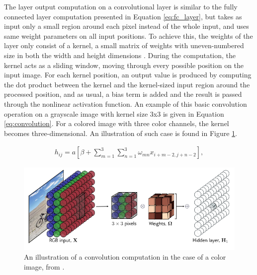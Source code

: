 \documentclass{article}
\begin{document}
The layer output computation on a convolutional layer is similar to the fully connected layer computation
presented in Equation \ref{eq:fc_layer}, but takes as input only a small region around each pixel instead of 
the whole input, and uses same weight parameters on all input positions. To achieve this, the weights of the 
layer only consist of a kernel, a small 
matrix of weights with uneven-numbered size in both the width and height dimensions \cite{princebook}. During the computation, the kernel 
acts as a sliding window, moving through every possible position on the input image. For each kernel position, an output 
value is produced by computing the dot product between the kernel and the kernel-sized input region around the processed position, and as usual, a bias term is added and the result is passed through the nonlinear activation function.
An example of this basic convolution operation on a grayscale image with kernel size 3x3 is given in Equation \ref{eq:convolution}. 
For a colored image with three color channels, the kernel becomes three-dimensional. An illustration 
of such case is found in Figure \ref{image:3dkernel}.

\begin{align}
    h_{ij} = a \left[ \beta + \sum_{m=1}^{3} \sum_{n=1}^{3} \omega_{mn} x_{i+m-2, j+n-2} \right],
    \label{eq:convolution}
\end{align}

\begin{figure}[h]
    \centering
    \includegraphics*[scale=0.4]{../images/3dkernel.png}
    \caption{An illustration of a convolution computation in the case of a color image, from \cite{princebook}.}
    \label{image:3dkernel}
\end{figure}
\end{document}

